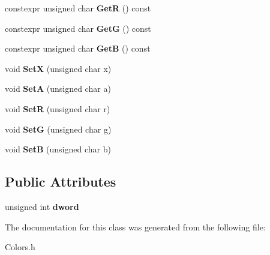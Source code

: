 \begin{DoxyCompactItemize}
constexpr unsigned char {\bfseries GetR} () const
\item 
\mbox{\label{class_color_ab3d9b9a9ee6022dcad662ed9b0051ca9}} 
constexpr unsigned char {\bfseries GetG} () const
\item 
\mbox{\label{class_color_a633c52d431432c9b8e5b3ff7dbf9d23a}} 
constexpr unsigned char {\bfseries GetB} () const
\item 
\mbox{\label{class_color_a96261574ca486337f4442be7916a070f}} 
void {\bfseries SetX} (unsigned char x)
\item 
\mbox{\label{class_color_a5b91faddcdde22a2af12c0de50a3f3fa}} 
void {\bfseries SetA} (unsigned char a)
\item 
\mbox{\label{class_color_aa666f3043251a75e9365ea5bb725b78c}} 
void {\bfseries SetR} (unsigned char r)
\item 
\mbox{\label{class_color_a79b9dc911c6ff5d237786344d460aa67}} 
void {\bfseries SetG} (unsigned char g)
\item 
\mbox{\label{class_color_afb9bdd7639f6ed0ad2334a9ffc92653c}} 
void {\bfseries SetB} (unsigned char b)
\end{DoxyCompactItemize}
\subsection*{Public Attributes}
\begin{DoxyCompactItemize}
\item 
\mbox{\label{class_color_ad467ce2d3ab71b51ec245ef4a64967ef}} 
unsigned int {\bfseries dword}
\end{DoxyCompactItemize}


The documentation for this class was generated from the following file\+:\begin{DoxyCompactItemize}
\item 
Colors.\+h\end{DoxyCompactItemize}
